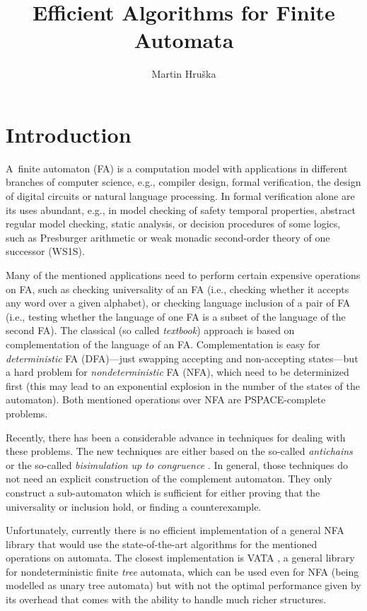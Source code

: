 \documentclass{eeict}
\title{Efficient Algorithms for Finite Automata}
\author{Martin Hruška}
\begin{document}

\maketitle

\section{Introduction}
A~finite automaton (FA) is a computation model with applications in different branches of computer science, e.g., compiler design, formal verification, 
the design of digital circuits or natural language processing. In formal verification alone are its uses abundant, 
e.g., in model checking of safety temporal properties, abstract regular model checking, static analysis, 
or decision procedures of some logics, such as Presburger arithmetic or weak 
monadic second-order theory of one successor (WS1S).

Many of the mentioned applications need to perform certain expensive operations on FA, such as checking universality of an FA (i.e., checking whether it
accepts any word over a given alphabet), or checking language inclusion of a pair of FA (i.e., testing whether the language of one FA is a subset of the language
of the second FA). The classical (so called \emph{textbook}) approach is based on complementation of the language of an FA. Complementation is easy for 
\emph{deterministic} FA (DFA)---just swapping accepting and non-accepting states---but a hard problem for \emph{nondeterministic} FA (NFA), which need 
to be determinized first (this may lead to an exponential explosion in the number of the states of the automaton). 
Both mentioned operations over NFA are PSPACE-complete problems.

Recently, there has been a considerable advance in techniques for dealing with these problems. The new techniques are either based on the so-called 
\emph{antichains} \cite{cav06,tacas10} or the so-called \emph{bisimulation up to congruence} \cite{popl13}. 
In general, those techniques do not need an explicit construction of the complement
automaton. They only construct a sub-automaton which is sufficient for either proving that the universality or inclusion hold, or finding a counterexample.

Unfortunately, currently there is no efficient implementation of a general NFA library that would use the state-of-the-art algorithms for the mentioned
operations on automata. The
closest implementation is VATA \cite{libvata}, a general library for nondeterministic finite \emph{tree} automata, which can be used even for NFA (being modelled 
as unary tree automata) but with not the optimal performance given by its overhead that comes with the ability to handle much richer structures. 
\end{document}

